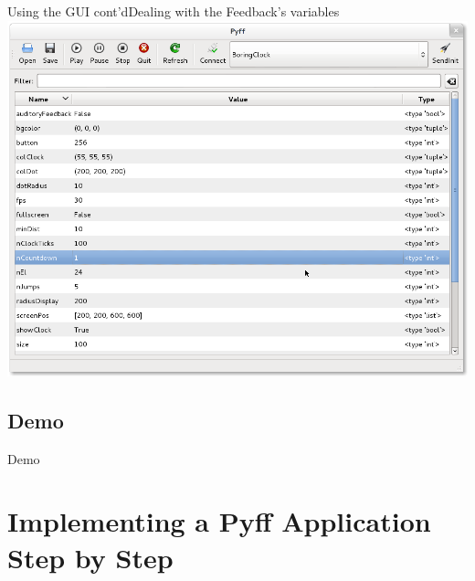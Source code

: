 \documentclass{beamer}
\begin{document}
\begin{frame}{Using the GUI cont'd}{Dealing with the Feedback's variables}
    \includegraphics[width=.9\linewidth]{gui}
\end{frame}

\subsection{Demo}
\begin{frame}[plain]
    \begin{center}
        \huge{Demo}
    \end{center}
\end{frame}


\section{Implementing a Pyff Application Step by Step}
\end{document}
